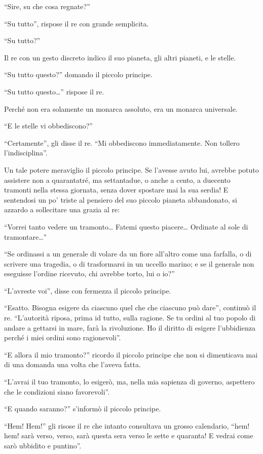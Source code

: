 \documentclass[11pt]{scrbook}
\begin{document}
``Sire, su che cosa regnate?''

``Su tutto'', rispose il re con grande semplicita.

``Su tutto?''

Il re con un gesto discreto indico il suo pianeta, gli altri pianeti, e
le stelle.

``Su tutto questo?'' domando il piccolo principe.

``Su tutto questo\ldots{}'' rispose il re.

Perché non era solamente un monarca assoluto, era un monarca universale.

``E le stelle vi obbediscono?''

``Certamente'', gli disse il re. ``Mi obbediscono immediatamente. Non
tollero l'indisciplina''.

Un tale potere meraviglio il piccolo principe. Se l'avesse avuto lui,
avrebbe potuto assistere non a quarantatré, ma settantadue, o anche a
cento, a duecento tramonti nella stessa giornata, senza dover spostare
mai la sua serdia! E sentendosi un po' triste al pensiero del suo
piccolo pianeta abbandonato, si azzardo a sollecitare una grazia al re:

``Vorrei tanto vedere un tramonto\ldots{} Fatemi questo piacere\ldots{}
Ordinate al sole di tramontare\ldots{}''

``Se ordinassi a un generale di volare da un fiore all'altro come una
farfalla, o di scrivere una tragedia, o di trasformarsi in un uccello
marino; e se il generale non eseguisse l'ordine ricevuto, chi avrebbe
torto, lui o io?''

``L'avreste voi'', disse con fermezza il piccolo principe.

``Esatto. Bisogna esigere da ciascuno quel che che ciascuno può dare'',
continuò il re. ``L'autorità riposa, prima id tutto, sulla ragione. Se
tu ordini al tuo popolo di andare a gettarsi in mare, farà la
rivoluzione. Ho il diritto di esigere l'ubbidienza perché i miei ordini
sono ragionevoli''.

``E allora il mio tramonto?'' ricordo il piccolo principe che non si
dimenticava mai di una domanda una volta che l'aveva fatta.

``L'avrai il tuo tramonto, lo esigerò, ma, nella mia sapienza di
governo, aspettero che le condizioni siano favorevoli''.

``E quando saranno?'' s'informò il piccolo principe.

``Hem! Hem!'' gli risose il re che intanto consultava un grosso
calendario, ``hem! hem! sarà verso, verso, sarà questa sera verso le
sette e quaranta! E vedrai come sarò ubbidito e puntino''.
\end{document}
